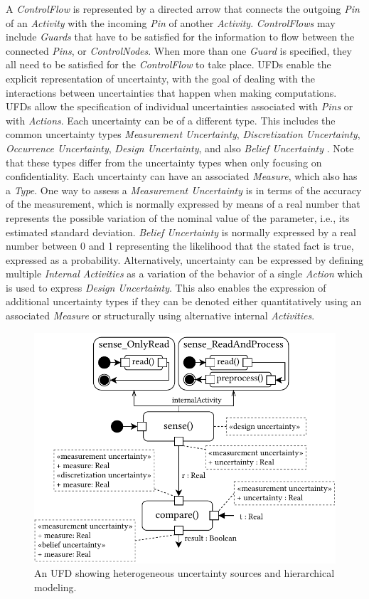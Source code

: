 A \emph{ControlFlow} is represented by a directed arrow that connects the outgoing \emph{Pin} of an \emph{Activity} with the incoming \emph{Pin} of another \emph{Activity}. 
\emph{ControlFlows} may include \emph{Guards} that have to be satisfied for the information to flow between the connected \emph{Pins}, or \emph{ControlNodes}. 
When more than one \emph{Guard} is specified, they all need to be satisfied for the \emph{ControlFlow} to take place.
\acp{UFD} enable the explicit representation of uncertainty, with the goal of dealing with the interactions between uncertainties that happen when making computations. 
\acp{UFD} allow the specification of individual uncertainties associated with \emph{Pins} or with \emph{Actions}. 
Each uncertainty can be of a different type.
This includes the common uncertainty types \emph{Measurement Uncertainty}, \emph{Discretization Uncertainty}, \emph{Occurrence Uncertainty}, \emph{Design Uncertainty}, and also \emph{Belief Uncertainty} \cite{troya_uncertainty_2021}.
Note that these types differ from the uncertainty types when only focusing on confidentiality.
Each uncertainty can have an associated \emph{Measure}, which also has a \emph{Type}. 
One way to assess a \emph{Measurement Uncertainty} is in terms of the accuracy of the measurement, which is normally expressed by means of a real number that represents the possible variation of the nominal value of the parameter, i.e., its estimated standard deviation. 
\emph{Belief Uncertainty} is normally expressed by a real number between 0 and 1 representing the likelihood that the stated fact is true, expressed as a probability.
Alternatively, uncertainty can be expressed by defining multiple \emph{Internal Activities} as a variation of the behavior of a single \emph{Action} which is used to express \emph{Design Uncertainty}.
This also enables the expression of additional uncertainty types if they can be denoted either quantitatively using an associated \emph{Measure} or structurally using alternative internal \emph{Activities}.

\begin{figure}
    \centering
    \includegraphics[width=0.8\linewidth]{figures/chapter6/ufd-example.pdf}
    \caption{An \acf*{UFD} showing heterogeneous uncertainty sources and hierarchical modeling.}
    \label{fig:impactanalysis:ufdexample}
\end{figure}

